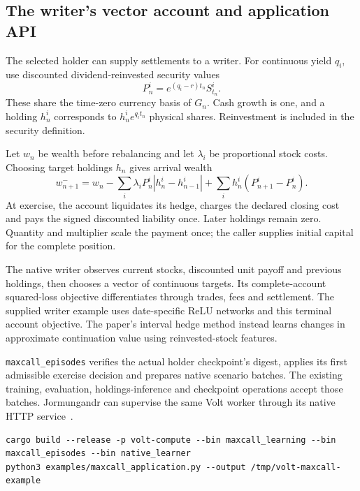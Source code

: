 \documentclass[8pt]{strategynet-journal}
\begin{document}
\begin{SNcolumns}
\section{The writer's vector account and application API}
The selected holder can supply settlements to a writer. For continuous yield
$q_i$, use discounted dividend-reinvested security values
\[
 P_n^i=e^{(q_i-r)t_n}S_{t_n}^i.
\]
These share the time-zero currency basis of $G_n$. Cash growth is one, and a
holding $h_n^i$ corresponds to $h_n^i e^{q_i t_n}$ physical shares. Reinvestment
is included in the security definition.

Let $w_n$ be wealth before rebalancing and let $\lambda_i$ be proportional
stock costs. Choosing target holdings $h_n$ gives arrival wealth
\[
 w_{n+1}^{-}=w_n-
 \sum_i\lambda_iP_n^i|h_n^i-h_{n-1}^i|
 +\sum_i h_n^i(P_{n+1}^i-P_n^i).
\]
At exercise, the account liquidates its hedge, charges the declared closing
cost and pays the signed discounted liability once. Later holdings remain
zero. Quantity and multiplier scale the payment once; the caller supplies
initial capital for the complete position.

The native writer observes current stocks, discounted unit payoff and previous
holdings, then chooses a vector of continuous targets. Its complete-account
squared-loss objective differentiates through trades, fees and settlement.
The supplied writer example uses date-specific ReLU networks and this terminal
account objective. The paper's interval hedge method instead learns changes
in approximate continuation value using reinvested-stock features.

\texttt{maxcall\_episodes} verifies the actual holder checkpoint's digest,
applies its first admissible exercise decision and prepares native scenario
batches. The existing training, evaluation, holdings-inference and checkpoint
operations accept those batches. Jormungandr can supervise the same Volt
worker through its native HTTP service~\cite{api}.
\end{SNcolumns}
\noindent\begin{minipage}{\textwidth}
\begin{lstlisting}[basicstyle=\ttfamily\normalsize,frame=single,breaklines=true]
cargo build --release -p volt-compute --bin maxcall_learning --bin maxcall_episodes --bin native_learner
python3 examples/maxcall_application.py --output /tmp/volt-maxcall-example
\end{lstlisting}
\end{minipage}
\end{document}
